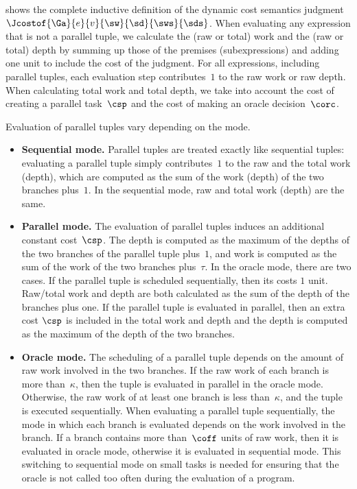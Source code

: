  
 shows the complete inductive definition of the
dynamic cost semantics judgment $\Jcostof{\Ga}{ e
}{v}{\sw}{\sd}{\sws}{\sds}$.  When evaluating any expression that is
not a parallel tuple, we calculate the (raw or total) work and the
(raw or total) depth by summing up those of the premises
(subexpressions) and adding one unit to include the cost of the
judgment.  For all expressions, including parallel tuples, each
evaluation step contributes~$1$ to the raw work or raw depth.  When
calculating total work and total depth, we take into account the cost
of creating a parallel task~$\csp$ and the cost of making an oracle
decision~$\corc$.

Evaluation of parallel tuples vary depending on the mode.  

\begin{itemize}

\item \textbf{Sequential mode.} Parallel tuples are treated exactly
  like sequential tuples: evaluating a parallel tuple simply
  contributes~$1$ to the raw and the total work (depth), which are
  computed as the sum of the work (depth) of the two branches
  plus~$1$.  In the sequential mode, raw and total work (depth) are
  the same.

\item \textbf{Parallel mode.} The evaluation of parallel tuples induces
  an additional constant cost~$\csp$. The depth is computed as the
  maximum of the depths of the two branches of the parallel tuple
  plus~$1$, and work is computed as the sum of the work of the two
  branches plus~$\tau$. In the oracle mode, there are two cases.  If
  the parallel tuple is scheduled sequentially, then its costs $1$
  unit.  Raw/total work and depth are both calculated as the sum of
  the depth of the branches plus one.  If the parallel tuple is
  evaluated in parallel, then an extra cost $\csp$ is included in the
  total work and depth and the depth is computed as the maximum of the
  depth of the two branches.

\item \textbf{Oracle mode.} The scheduling of a parallel tuple depends
  on the amount of raw work involved in the two branches.  If the raw
  work of each branch is more than~$\kappa$, then the tuple is
  evaluated in parallel in the oracle mode.  Otherwise, the raw work
  of at least one branch is less than~$\kappa$, and the tuple is
  executed sequentially.  When evaluating a parallel tuple
  sequentially, the mode in which each branch is evaluated depends on
  the work involved in the branch.  If a branch contains more
  than~$\coff$ units of raw work, then it is evaluated in  oracle
  mode, otherwise it is evaluated in  sequential mode.  This
  switching to sequential mode on small tasks is needed for ensuring
  that the oracle is not called too often during the evaluation of a
  program.
\end{itemize}



